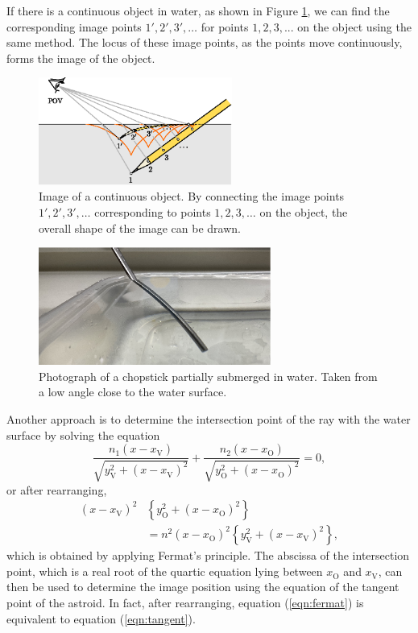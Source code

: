 \documentclass[twocolumn]{article}
\begin{document}
If there is a continuous object in water, as shown in Figure \ref{fig:extended_image}, we can find the corresponding image points $1', 2', 3', \dots$ for points $1, 2, 3, ...$ on the object using the same method. The locus of these image points, as the points move continuously, forms the image of the object.

\begin{figure}[h]
	\centering
	\includegraphics*[width=2.5in]{figs/g242.eps}
	\caption{Image of a continuous object. By connecting the image points $1', 2', 3', \dots$ corresponding to points $1, 2, 3, \dots$ on the object, the overall shape of the image can be drawn.}
	\label{fig:extended_image}
\end{figure}

\begin{figure}[!h]
	\centering
	\includegraphics[width=3in]{figs/img_1805_2.eps}
	\caption{Photograph of a chopstick partially submerged in water. Taken from a low angle close to the water surface.}
	\label{fig:picture}
\end{figure}

Another approach is to determine the intersection point of the ray with the water surface by solving the equation
\[
\dfrac{n_1 \left( x - x_{\mathrm{V}}^{} \right)}{\sqrt{ y_{\mathrm{V}}^2 + \left( x - x_{\mathrm{V}}^{} \right)^2 }}
+\dfrac{n_2 \left( x - x_{\mathrm{O}}^{} \right)}{\sqrt{ y_{\mathrm{O}}^2 + \left( x - x_{\mathrm{O}}^{} \right)^2 }}
= 0,
\]
or after rearranging,
\begin{equation} \label{eqn:fermat}
	\begin{aligned}
		\left( x - x_{\mathrm{V}}^{} \right)^2 &\left\{ y_{\mathrm{O}}^2 + \left(x - x_{\mathrm{O}}^{} \right)^2 \right\} \\
		&= n^2 \left( x - x_{\mathrm{O}}^{} \right)^2 \left\{ y_{\mathrm{V}}^2 + \left(x - x_{\mathrm{V}}^{} \right)^2 \right\},
	\end{aligned}
\end{equation}
which is obtained by applying Fermat's principle. The abscissa of the intersection point, which is a real root of the quartic equation
lying between $x_{\mathrm{O}}^{}$ and $x_{\mathrm{V}}^{}$, can then be used to determine the image position using the equation of the tangent point of the astroid.
In fact, after rearranging, equation (\ref{eqn:fermat}) is equivalent to equation (\ref{eqn:tangent}).
\end{document}
